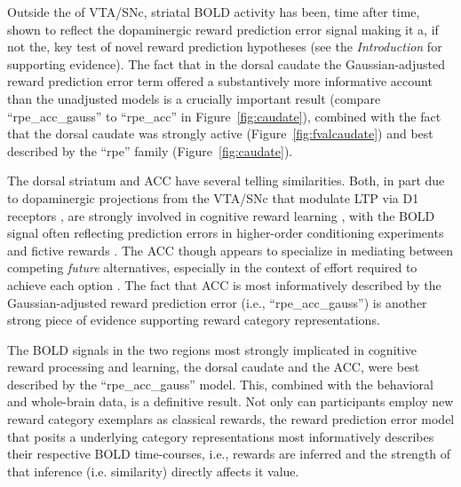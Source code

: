 Outside the of VTA/SNc, striatal BOLD activity has been, time after time, shown to reflect the dopaminergic reward prediction error signal making it a, if not the, key test of novel reward prediction hypotheses (see the \emph{Introduction} for supporting evidence).  The fact that in the dorsal caudate the Gaussian-adjusted reward prediction error term offered a substantively more informative account than the unadjusted models is a crucially important result (compare ``rpe\_acc\_gauss'' to ``rpe\_acc'' in Figure~\ref{fig:caudate}), combined with the fact that the dorsal caudate was strongly active (Figure~\ref{fig:fvalcaudate}) and best described by the ``rpe'' family (Figure~\ref{fig:caudate}).  

The dorsal striatum and ACC have several telling similarities.  Both, in part due to dopaminergic projections from the VTA/SNc that modulate LTP via D1 receptors \citep{Schweimer:2006p9780}, are strongly involved in cognitive reward learning \citep{Atlas:2010p7566,Hayden:2009p6545,Rudebeck:2008p4712,Rolls:2008p7577,Quilodran:2008p2645,Hampton:2007p2983,Ernst:2004p3998}, with the BOLD signal often reflecting prediction errors in higher-order conditioning experiments \citep{seymour:2004aa} and fictive rewards \citep{Hayden:2009p6545}.  The ACC though appears to specialize in mediating between competing \emph{future} alternatives, especially in the context of effort required to achieve each option \citep{Quilodran:2008p2645}.  The fact that ACC is most informatively described by the Gaussian-adjusted reward prediction error (i.e., ``rpe\_acc\_gauss'') is another strong piece of evidence supporting reward category representations.  

 The BOLD signals in the two regions most strongly implicated in cognitive reward processing and learning, the dorsal caudate and the ACC, were best described by the ``rpe\_acc\_gauss'' model.  This, combined with the behavioral and whole-brain data, is a definitive result.  Not only can participants employ new reward category exemplars as classical rewards, the reward prediction error model that posits a underlying category representations most informatively describes their respective BOLD time-courses, i.e., rewards are inferred and the strength of that inference (i.e. similarity) directly affects it value.

